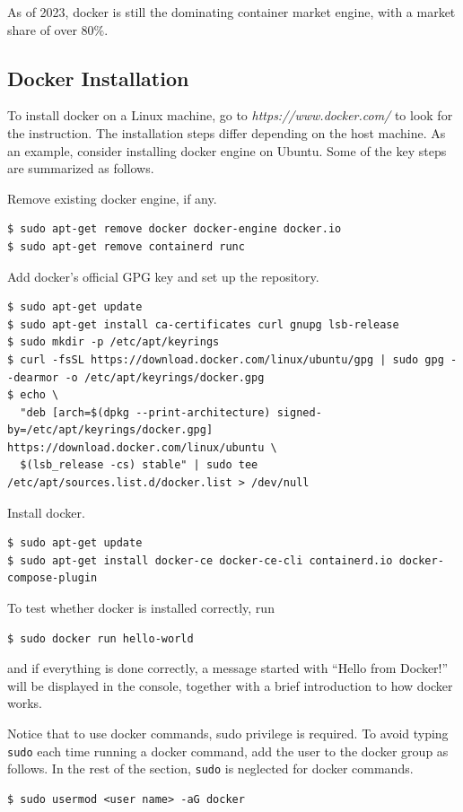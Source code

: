 As of 2023, docker is still the dominating container market engine, with a market share of over $80\%$.

\subsection{Docker Installation}

To install docker on a Linux machine, go to \textit{https://www.docker.com/} to look for the instruction. The installation steps differ depending on the host machine. As an example, consider installing docker engine on Ubuntu. Some of the key steps are summarized as follows.

Remove existing docker engine, if any.
\begin{lstlisting}
$ sudo apt-get remove docker docker-engine docker.io
$ sudo apt-get remove containerd runc
\end{lstlisting}
Add docker's official GPG key and set up the repository.
\begin{lstlisting}
$ sudo apt-get update
$ sudo apt-get install ca-certificates curl gnupg lsb-release
$ sudo mkdir -p /etc/apt/keyrings
$ curl -fsSL https://download.docker.com/linux/ubuntu/gpg | sudo gpg --dearmor -o /etc/apt/keyrings/docker.gpg
$ echo \
  "deb [arch=$(dpkg --print-architecture) signed-by=/etc/apt/keyrings/docker.gpg] https://download.docker.com/linux/ubuntu \
  $(lsb_release -cs) stable" | sudo tee /etc/apt/sources.list.d/docker.list > /dev/null
\end{lstlisting}
Install docker.
\begin{lstlisting}
$ sudo apt-get update
$ sudo apt-get install docker-ce docker-ce-cli containerd.io docker-compose-plugin
\end{lstlisting}
To test whether docker is installed correctly, run
\begin{lstlisting}
$ sudo docker run hello-world
\end{lstlisting}
and if everything is done correctly, a message started with ``Hello from Docker!'' will be displayed in the console, together with a brief introduction to how docker works.

Notice that to use docker commands, sudo privilege is required. To avoid typing \verb|sudo| each time running a docker command, add the user to the docker group as follows. In the rest of the section, \verb|sudo| is neglected for docker commands.
\begin{lstlisting}
$ sudo usermod <user name> -aG docker
\end{lstlisting}


